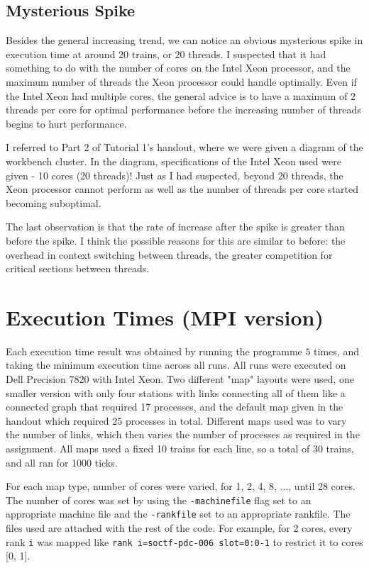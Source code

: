 \documentclass[12pt]{article}
\begin{document}
\subsection{Mysterious Spike}

Besides the general increasing trend, we can notice an obvious mysterious spike in execution time at around $20$ trains, or $20$ threads. I suspected that it had something to do with the number of cores on the Intel Xeon processor, and the maximum number of threads the Xeon processor could handle optimally. Even if the Intel Xeon had multiple cores, the general advice is to have a maximum of $2$ threads per core for optimal performance before the increasing number of threads begins to hurt performance.

\bigbreak \noindent I referred to Part 2 of Tutorial 1's handout, where we were given a diagram of the workbench cluster. In the diagram, specifications of the Intel Xeon used were given - 10 cores (20 threads)! Just as I had suspected, beyond 20 threads, the Xeon processor cannot perform as well as the number of threads per core started becoming suboptimal. 

\bigbreak \noindent The last observation is that the rate of increase after the spike is greater than before the spike. I think the possible reasons for this are similar to before: the overhead in context switching between threads, the greater competition for critical sections between threads.

\section{Execution Times (MPI version)}

Each execution time result was obtained by running the programme $5$ times, and taking the minimum execution time across all runs. All runs were executed on Dell Precision 7820 with Intel Xeon. Two different "map" layouts were used, one smaller version with only four stations with links connecting all of them like a connected graph that required 17 processes, and the default map given in the handout which required 25 processes in total. Different maps used was to vary the number of links, which then varies the number of processes as required in the assignment. All maps used a fixed 10 trains for each line, so a total of 30 trains, and all ran for 1000 ticks.

\bigbreak \noindent For each map type, number of cores were varied, for 1, 2, 4, 8, ..., until 28 cores. The number of cores was set by using the \verb!-machinefile! flag set to an appropriate machine file and the \verb!-rankfile! set to an appropriate rankfile. The files used are attached with the rest of the code. For example, for 2 cores, every rank \verb!i! was mapped like \verb!rank i=soctf-pdc-006 slot=0:0-1! to restrict it to cores [0, 1].
\end{document}
